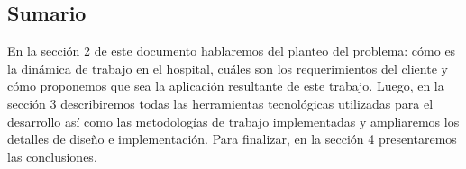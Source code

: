 \subsection{Sumario}
En la sección 2 de este documento hablaremos del planteo del problema: cómo es la dinámica de trabajo en el hospital, cuáles son los requerimientos del cliente y cómo proponemos que sea la aplicación resultante de este trabajo. Luego, en la sección 3 describiremos todas las herramientas tecnológicas utilizadas para el desarrollo así como las metodologías de trabajo implementadas y ampliaremos los detalles de diseño e implementación. Para finalizar, en la sección 4 presentaremos las conclusiones. 

